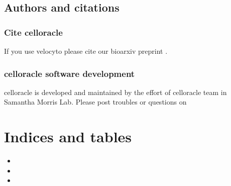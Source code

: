 \documentclass[letterpaper,10pt,english]{sphinxmanual}
\begin{document}
%
\begin{sphinxVerbatim}[commandchars=\\\{\}]
 

        


         
\end{sphinxVerbatim}


\section{Authors and citations}
\label{\detokenize{citation/index:authors-and-citations}}\label{\detokenize{citation/index:citing}}\label{\detokenize{citation/index::doc}}

\subsection{Cite celloracle}
\label{\detokenize{citation/index:cite-celloracle}}
If you use velocyto please cite our bioarxiv preprint .


\subsection{celloracle software development}
\label{\detokenize{citation/index:celloracle-software-development}}
celloracle is developed and maintained by the effort of celloracle team in Samantha Morris Lab.
Please post troubles or questions on  


\chapter{Indices and tables}
\label{\detokenize{index:indices-and-tables}}\begin{itemize}
\item {} 

\item {} 

\item {} 

\end{itemize}
\end{document}
